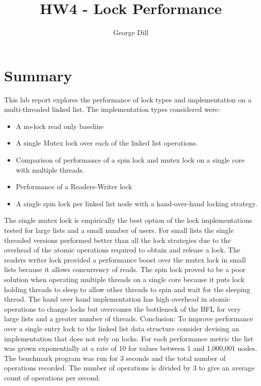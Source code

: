 \documentclass{article}
\title{HW4 - Lock Performance}
\author{George Dill}
\begin{document}
\maketitle

\section{Summary}
This lab report explores the performance of lock types and implementation on a multi-threaded 
linked list. The implementation types considered were:
	\begin{itemize}
		\item A no-lock read only baseline
		\item A single Mutex lock over each of the linked list operations. 
		\item Comparison of performance of a spin lock and mutex lock on a single core 
				with multiple threads. 
		\item Performance of a Readers-Writer lock
		\item A single spin lock per linked list node with a hand-over-hand locking strategy. 
	\end{itemize}
The single mutex lock is empirically the best option of the lock implementations tested 
for large lists and a small number of users. For small lists the single threaded versions 
performed better than all 
the lock strategies due to the overhead of the atomic operations required to obtain and 
release a lock. The readers writer lock provided a performance boost over the mutex lock 
in small lists because it allows concurrency of reads. The spin lock proved to be a poor 
solution when operating multiple threads on a single core because it puts lock holding 
threads to sleep to allow other threads to spin and wait for the sleeping thread. The 
hand over hand implementation has high overhead in atomic operations to change locks but 
overcomes the bottleneck of the BFL for very large lists and a greater number of threads. 
\newline
\newline
Conclusion: To improve performance over a single entry lock to the linked list data 
structure consider devising an implementation that does not rely on locks.  
\newline
\newline
For each performance metric the list was grown exponentially at a rate of 10 for 
values between 1 and 1,000,001 nodes. The benchmark program was run for 3 seconds and the 
total number of operations recorded. The number of operations is divided by 3 to give an 
average count of operations per second.
\end{document}
